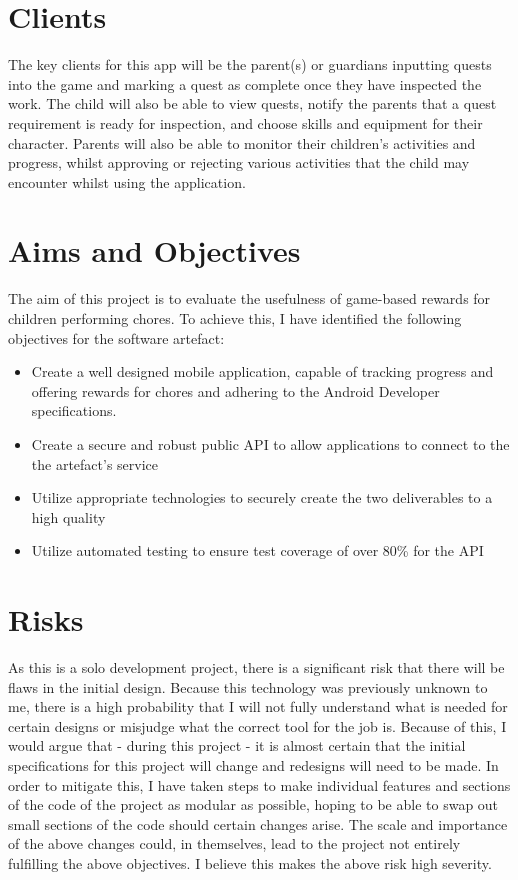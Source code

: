 \section{Clients}
The key clients for this app will be the parent(s) or guardians inputting quests into the game and marking a quest as complete once they have inspected the work. 
The child will also be able to view quests, notify the parents that a quest requirement is ready for inspection, and choose skills and equipment for their character.
Parents will also be able to monitor their children's activities and progress, whilst approving or rejecting various activities that the child may encounter whilst using the application. 

\section{Aims and Objectives}
The aim of this project is to evaluate the usefulness of game-based rewards for children performing chores. 
To achieve this, I have identified the following objectives for the software artefact:

\begin{itemize}
	\item Create a well designed mobile application, capable of tracking progress and offering rewards for chores and adhering to the Android Developer specifications.
	\item Create a secure and robust public API to allow applications to connect to the the artefact's service
	\item Utilize appropriate technologies to securely create the two deliverables to a high quality
	\item Utilize automated testing to ensure test coverage of over 80\% for the API
\end{itemize}

\section{Risks}
As this is a solo development project, there is a significant risk that there will be flaws in the initial design. 
Because this technology was previously unknown to me, there is a high probability that I will not fully understand what is needed for certain designs or misjudge what the correct tool for the job is.
Because of this, I would argue that - during this project - it is almost certain that the initial specifications for this project will change and redesigns will need to be made.
In order to mitigate this, I have taken steps to make individual features and sections of the code of the project as modular as possible, hoping to be able to swap out small sections of the code should certain changes arise.
The scale and importance of the above changes could, in themselves, lead to the project not entirely fulfilling the above objectives. I believe this makes the above risk high severity.

